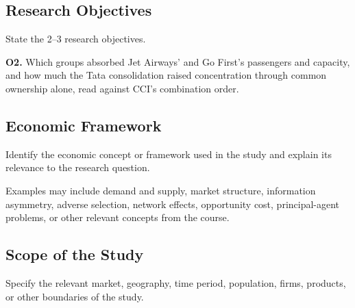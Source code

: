 \documentclass[12pt,a4paper]{article}
\newenvironment{mycontribution}{\par\color{blue}\captionsetup{font+={color=blue}}}{\par}
\begin{document}
\subsection{Research Objectives}
State the 2--3 research objectives.

\begin{mycontribution}
\textbf{O2.} Which groups absorbed Jet Airways' and Go First's passengers and capacity, and how much the Tata consolidation raised concentration through common ownership alone, read against CCI's combination order.
\end{mycontribution}

\subsection{Economic Framework}
Identify the economic concept or framework used in the study and explain its relevance to the research question.

Examples may include demand and supply, market structure, information asymmetry, adverse selection, network effects, opportunity cost, principal-agent problems, or other relevant concepts from the course.

\subsection{Scope of the Study}
Specify the relevant market, geography, time period, population, firms, products, or other boundaries of the study.
\end{document}
